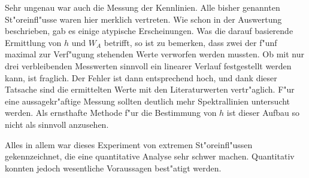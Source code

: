 \documentclass[a4paper,10pt]{article}
\begin{document}
  Sehr ungenau war auch die Messung der Kennlinien. Alle bisher genannten St"oreinfl"usse waren hier merklich vertreten. Wie schon in der Auswertung beschrieben, gab es einige atypische Erscheinungen. Was die darauf basierende Ermittlung von $h$ und $W_A$ betrifft, so ist zu bemerken, dass zwei der f"unf maximal zur Verf"ugung stehenden Werte verworfen werden mussten. Ob mit nur drei verbleibenden Messwerten sinnvoll ein linearer Verlauf festgestellt werden kann, ist fraglich. Der Fehler ist dann entsprechend hoch, und dank dieser Tatsache sind die ermittelten Werte mit den Literaturwerten vertr"aglich. F"ur eine aussagekr"aftige Messung sollten deutlich mehr Spektrallinien untersucht werden.
  Als ernsthafte Methode f"ur die Bestimmung von $h$ ist dieser Aufbau so nicht als sinnvoll anzusehen.

  Alles in allem war dieses Experiment von extremen St"oreinfl"ussen gekennzeichnet, die eine quantitative Analyse sehr schwer machen. Quantitativ konnten jedoch wesentliche Voraussagen best"atigt werden.
\end{document}
